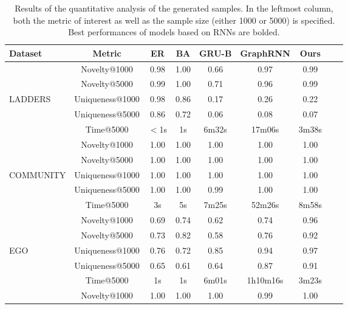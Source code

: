 \begin{table}[h!]
    \footnotesize
    \centering
    \caption{Results of the quantitative analysis of the generated samples. In the leftmost column, both the metric of interest as well as the sample size (either 1000 or 5000) is specified. Best performances of models based on RNNs are bolded.}
    \label{tab:graph-quantitative}
    \renewcommand{\arraystretch}{1.2}
    \begin{tabular}{lcccccccc}
        \toprule
         \textbf{Dataset} & \textbf{Metric} & \textbf{ER} & \textbf{BA} & \textbf{GRU-B} & \textbf{GraphRNN} & \textbf{Ours} \\
         \midrule
          & Novelty@1000              & 0.98  & 1.00 & 0.66  & 0.97   & 0.99\\
          & Novelty@5000              & 0.99  & 1.00 & 0.71  & 0.96   & 0.99\\
          LADDERS & Uniqueness@1000   & 0.98  & 0.86 & 0.17  & 0.26   & 0.22\\
          & Uniqueness@5000           & 0.86  & 0.72 & 0.06  & 0.08   & 0.07\\
          & Time@5000                 & $<$1s & 1s   & 6m32s & 17m06s & 3m38s\\
         \midrule
          & Novelty@1000              & 1.00 & 1.00 & 1.00  & 1.00   & 1.00\\
          & Novelty@5000              & 1.00 & 1.00 & 1.00  & 1.00   & 1.00\\
          COMMUNITY & Uniqueness@1000 & 1.00 & 1.00 & 1.00  & 1.00   & 1.00\\
          & Uniqueness@5000           & 1.00 & 1.00 & 0.99  & 1.00   & 1.00\\
          & Time@5000                 & 3s   & 5s   & 7m25s & 52m26s & 8m58s\\
         \midrule
          & Novelty@1000              & 0.69 & 0.74 & 0.62  & 0.74     & 0.96\\
          & Novelty@5000              & 0.73 & 0.82 & 0.58  & 0.76     & 0.92\\
          EGO & Uniqueness@1000       & 0.76 & 0.72 & 0.85  & 0.94     & 0.97\\
          & Uniqueness@5000           & 0.65 & 0.61 & 0.64  & 0.87     & 0.91\\
          & Time@5000                 & 1s   & 1s   & 6m01s & 1h10m16s & 3m23s\\
        \midrule
          & Novelty@1000              & 1.00 & 1.00 & 1.00   & 0.99     & 1.00\\

\end{tabular}
\end{table}
